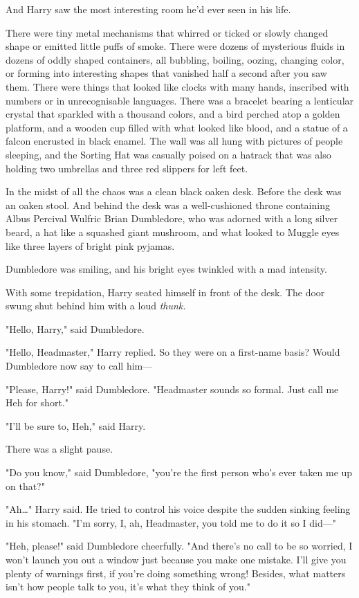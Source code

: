 And Harry saw the most interesting room he'd ever seen in his life.

There were tiny metal mechanisms that whirred or ticked or slowly changed shape 
or emitted little puffs of smoke. There were dozens of mysterious fluids in 
dozens of oddly shaped containers, all bubbling, boiling, oozing, changing 
color, or forming into interesting shapes that vanished half a second after you 
saw them. There were things that looked like clocks with many hands, inscribed 
with numbers or in unrecognisable languages. There was a bracelet bearing a 
lenticular crystal that sparkled with a thousand colors, and a bird perched 
atop a golden platform, and a wooden cup filled with what looked like blood, 
and a statue of a falcon encrusted in black enamel. The wall was all hung with 
pictures of people sleeping, and the Sorting Hat was casually poised on a 
hatrack that was also holding two umbrellas and three red slippers for left 
feet.

In the midst of all the chaos was a clean black oaken desk. Before the desk was 
an oaken stool. And behind the desk was a well-cushioned throne containing 
Albus Percival Wulfric Brian Dumbledore, who was adorned with a long silver 
beard, a hat like a squashed giant mushroom, and what looked to Muggle eyes 
like three layers of bright pink pyjamas.

Dumbledore was smiling, and his bright eyes twinkled with a mad intensity.

With some trepidation, Harry seated himself in front of the desk. The door 
swung shut behind him with a loud \emph{thunk.}

"Hello, Harry," said Dumbledore.

"Hello, Headmaster," Harry replied. So they were on a first-name basis? Would 
Dumbledore now say to call him---

"Please, Harry!" said Dumbledore. "Headmaster sounds so formal. Just call me 
Heh for short."

"I'll be sure to, Heh," said Harry.

There was a slight pause.

"Do you know," said Dumbledore, "you're the first person who's ever taken me up 
on that?"

"Ah{\ldots}" Harry said. He tried to control his voice despite the sudden 
sinking feeling in his stomach. "I'm sorry, I, ah, Headmaster, you told me to 
do it so I did---"

"Heh, please!" said Dumbledore cheerfully. "And there's no call to be so 
worried, I won't launch you out a window just because you make one mistake. 
I'll give you plenty of warnings first, if you're doing something wrong! 
Besides, what matters isn't how people talk to you, it's what they think of 
you."

